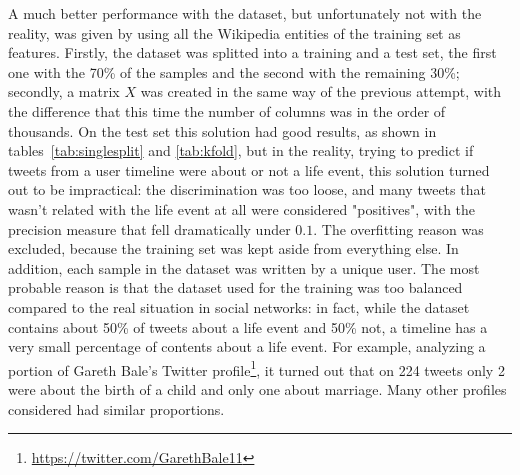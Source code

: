 \begin{table}[htbp]
\centering
{}\qquad\qquad
{}
\caption{The performance of the naive bayes were satisfactory on a very balanced dataset. Unfortunatly, users' timelines are very unbalanced, and this classifier turned out to be inappropriate.}
\end{table}

A much better performance with the dataset, but unfortunately not with the reality, was given by using all the Wikipedia entities of the training set as features. Firstly, the dataset was splitted into a training and a test set, the first one with the 70\% of the samples and the second with the remaining 30\%; secondly, a matrix $X$ was created in the same way of the previous attempt, with the difference that this time the number of columns was in the order of thousands. On the test set this solution had good results, as shown in tables~\ref{tab:singlesplit} and \ref{tab:kfold}, but in the reality, trying to predict if tweets from a user timeline were about or not a life event, this solution turned out to be impractical: the discrimination was too loose, and many tweets that wasn't related with the life event at all were considered "positives", with the precision measure that fell dramatically under $0.1$. The overfitting reason was excluded, because the training set was kept aside from everything else. In addition, each sample in the dataset was written by a unique user. The most probable reason is that the dataset used for the training was too balanced compared to the real situation in social networks: in fact, while the dataset contains about 50\% of tweets about a life event and 50\% not, a timeline has a very small percentage of contents about a life event. For example, analyzing a portion of Gareth Bale's Twitter profile\footnote{\url{https://twitter.com/GarethBale11}}, it turned out that on 224 tweets only 2 were about the birth of a child and only one about marriage. Many other profiles considered had similar proportions. 

